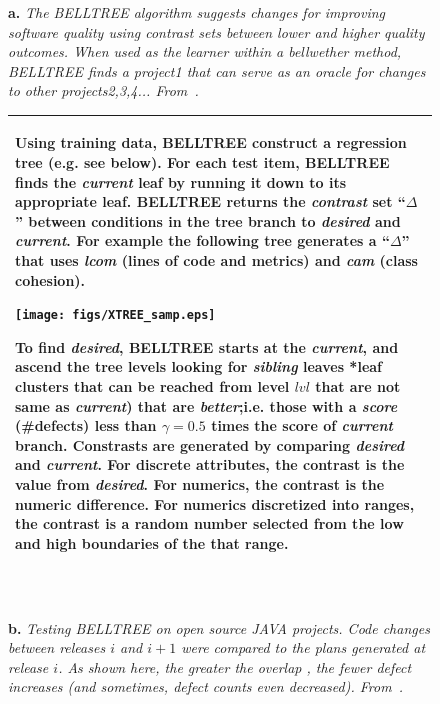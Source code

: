  \begin{figure}[!b]
 {\footnotesize
 \begin{minipage}{3.2in}
{\bf {}a.}   {\em  The BELLTREE algorithm  suggests changes  for improving software quality using  contrast sets between lower and higher quality outcomes. When used as the learner
within  a bellwether method,
BELLTREE finds a project1 that can serve as an oracle for changes to other projects2,3,4... From~\cite{rahulbelltreeTSE}.}\vspace{8mm} 
 
 \begin{tabular}{|p{.95\linewidth}|}\hline
 Using training data,
 BELLTREE  construct a regression tree (e.g. see below). For each test item, BELLTREE finds the {\em current} leaf by running  it down to its appropriate 
 leaf. BELLTREE returns the {\em contrast} set ``$\Delta$''  between conditions in the  tree branch to {\em desired} and {\em current}.
For example the following tree generates a  ``$\Delta$''  that
 uses {\em lcom} (lines of code and metrics) and {\em cam} (class cohesion).
 
\noindent\texttt{[image: figs/XTREE\_samp.eps]}
  
To find  {\em desired}, BELLTREE starts at the  {\em current}, and ascend the tree levels looking for  {\em sibling} leaves
*leaf clusters that can be reached from level $\mathit{lvl}$ that are not same as {\em current}) that are   {\em better};i.e. those with a {\em score} (\#defects) less than $\gamma=0.5$ times the score of {\em current} branch. 
Constrasts are generated by comparing {\em desired} and  {\em current}.
For  discrete attributes, the contrast is the value from {\em desired}. For  numerics, the contrast is the numeric difference. For numerics  discretized into ranges, the contrast is a random number selected from the low and high boundaries of the that range.  
 \\\hline
 \end{tabular}


 \end{minipage}~~
\begin{minipage}{3in}
 {\bf {}b.} {\em    Testing BELLTREE on    
  open source JAVA projects. Code   changes between releases $i$ and $i+1$ were compared to the plans generated
 at release $i$.   As shown here, the greater the overlap , the fewer
 defect increases (and sometimes, defect counts even decreased). From~\cite{rahulbelltreeTSE}.}\vspace{3mm} 
 


\end{minipage}}
\end{figure}
